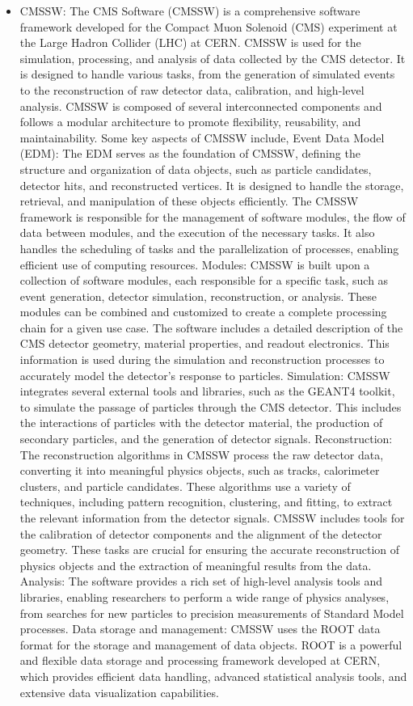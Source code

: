 \begin{itemize}
\item CMSSW: The CMS Software (CMSSW) is a comprehensive software framework developed for the Compact Muon Solenoid (CMS) experiment at the Large Hadron Collider (LHC) at CERN. CMSSW is used for the simulation, processing, and analysis of data collected by the CMS detector. It is designed to handle various tasks, from the generation of simulated events to the reconstruction of raw detector data, calibration, and high-level analysis. CMSSW is composed of several interconnected components and follows a modular architecture to promote flexibility, reusability, and maintainability. Some key aspects of CMSSW include, Event Data Model (EDM): The EDM serves as the foundation of CMSSW, defining the structure and organization of data objects, such as particle candidates, detector hits, and reconstructed vertices. It is designed to handle the storage, retrieval, and manipulation of these objects efficiently. The CMSSW framework is responsible for the management of software modules, the flow of data between modules, and the execution of the necessary tasks. It also handles the scheduling of tasks and the parallelization of processes, enabling efficient use of computing resources. Modules: CMSSW is built upon a collection of software modules, each responsible for a specific task, such as event generation, detector simulation, reconstruction, or analysis. These modules can be combined and customized to create a complete processing chain for a given use case. The software includes a detailed description of the CMS detector geometry, material properties, and readout electronics. This information is used during the simulation and reconstruction processes to accurately model the detector's response to particles. 
Simulation: CMSSW integrates several external tools and libraries, such as the GEANT4 toolkit, to simulate the passage of particles through the CMS detector. This includes the interactions of particles with the detector material, the production of secondary particles, and the generation of detector signals. Reconstruction: The reconstruction algorithms in CMSSW process the raw detector data, converting it into meaningful physics objects, such as tracks, calorimeter clusters, and particle candidates. These algorithms use a variety of techniques, including pattern recognition, clustering, and fitting, to extract the relevant information from the detector signals. CMSSW includes tools for the calibration of detector components and the alignment of the detector geometry. These tasks are crucial for ensuring the accurate reconstruction of physics objects and the extraction of meaningful results from the data. Analysis: The software provides a rich set of high-level analysis tools and libraries, enabling researchers to perform a wide range of physics analyses, from searches for new particles to precision measurements of Standard Model processes. Data storage and management: CMSSW uses the ROOT data format for the storage and management of data objects. ROOT is a powerful and flexible data storage and processing framework developed at CERN, which provides efficient data handling, advanced statistical analysis tools, and extensive data visualization capabilities.


\end{itemize}
